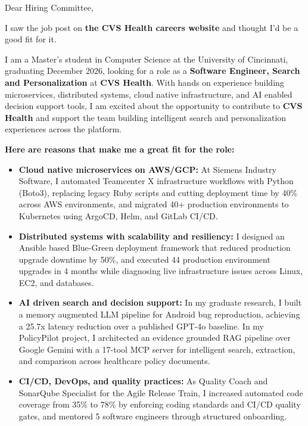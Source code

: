 \documentclass[11pt]{letter}
\date{}
\begin{document}
\begin{letter}{}

\opening{Dear Hiring Committee,}

I saw the job post on \textbf{the CVS Health careers website} and thought I'd be a good fit for it.

I am a Master's student in Computer Science at the University of Cincinnati, graduating December 2026, looking for a role as a \textbf{Software Engineer, Search and Personalization} at \textbf{CVS Health}. With hands on experience building microservices, distributed systems, cloud native infrastructure, and AI enabled decision support tools, I am excited about the opportunity to contribute to \textbf{CVS Health} and support the team building intelligent search and personalization experiences across the platform.

\textbf{Here are reasons that make me a great fit for the role:}

\begin{itemize}[leftmargin=*, itemsep=0.45em]
    \item \textbf{Cloud native microservices on AWS/GCP:} At Siemens Industry Software, I automated Teamcenter X infrastructure workflows with Python (Boto3), replacing legacy Ruby scripts and cutting deployment time by 40\% across AWS environments, and migrated 40+ production environments to Kubernetes using ArgoCD, Helm, and GitLab CI/CD.

    \item \textbf{Distributed systems with scalability and resiliency:} I designed an Ansible based Blue-Green deployment framework that reduced production upgrade downtime by 50\%, and executed 44 production environment upgrades in 4 months while diagnosing live infrastructure issues across Linux, EC2, and databases.

    \item \textbf{AI driven search and decision support:} In my graduate research, I built a memory augmented LLM pipeline for Android bug reproduction, achieving a 25.7x latency reduction over a published GPT-4o baseline. In my PolicyPilot project, I architected an evidence grounded RAG pipeline over Google Gemini with a 17-tool MCP server for intelligent search, extraction, and comparison across healthcare policy documents.

    \item \textbf{CI/CD, DevOps, and quality practices:} As Quality Coach and SonarQube Specialist for the Agile Release Train, I increased automated code coverage from 35\% to 78\% by enforcing coding standards and CI/CD quality gates, and mentored 5 software engineers through structured onboarding.
\end{itemize}


\end{letter}
\end{document}

